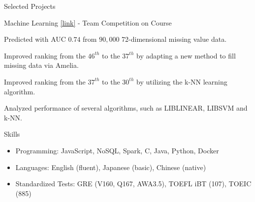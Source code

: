 \documentclass{cv}
\begin{document}
\begin{cvSection}{Selected Projects}
\begin{projectSubsection}
\end{projectSubsection}


\begin{projectSubsection}
{Machine Learning \href{http://main.learner.csie.ntu.edu.tw/php/ml12fall/scoreboardeachteam.php?start400=29&end400=100}{[link]}}
{ - }
{Team Competition on Course}

\item Predicted with AUC $0.74$ from $90,000$ 72-dimensional missing value data.
\item Improved ranking from the $46^{th}$ to the $37^{th}$ by adapting a new method to fill missing data via Amelia.
\item Improved ranking from the $37^{th}$ to the $30^{th}$ by utilizing the k-NN learning algorithm.
\item Analyzed performance of several algorithms, such as LIBLINEAR, LIBSVM and k-NN.

\end{projectSubsection}

\end{cvSection}








\begin{cvSection}{Skills}

\begin{itemize}[label=$\cdot$,leftmargin=0em]

\item Programming: JavaScript, NoSQL, Spark, C, Java, Python, Docker
\item Languages: English (fluent), Japanese (basic), Chinese (native)
\item Standardized Tests: GRE (V160, Q167, AWA3.5), TOEFL iBT (107), TOEIC (885)

\end{itemize}

\end{cvSection}
\end{document}
